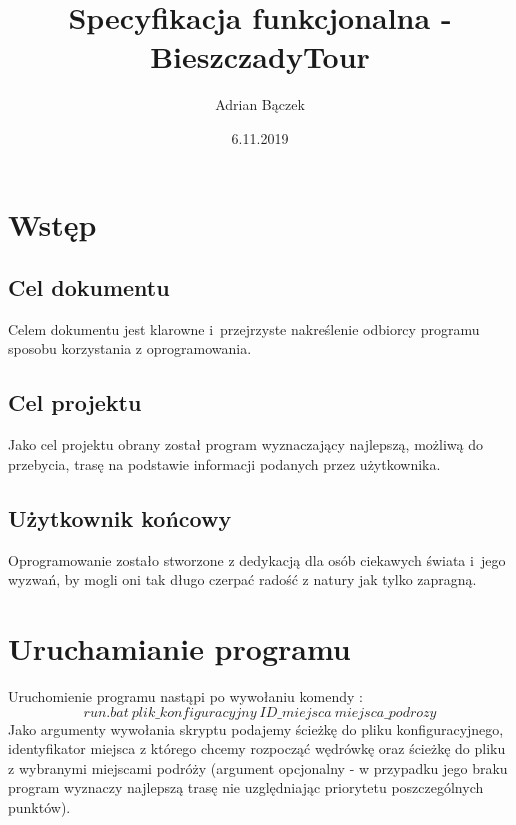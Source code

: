 \documentclass[10pt,oneside]{article}
\title{Specyfikacja funkcjonalna - BieszczadyTour}
\author{Adrian Bączek}
\date{6.11.2019}
\begin{document}
\maketitle


\thispagestyle{fancy}

\newpage


\section{Wstęp}
\subsection{Cel dokumentu}
Celem dokumentu jest klarowne i~przejrzyste nakreślenie 
odbiorcy programu sposobu korzystania z oprogramowania.
\subsection{Cel projektu}
Jako cel projektu obrany został program wyznaczający najlepszą, możliwą do przebycia, 
trasę na podstawie informacji podanych przez użytkownika.
\subsection{Użytkownik końcowy}
Oprogramowanie zostało stworzone z dedykacją dla osób ciekawych świata 
i~jego wyzwań, by mogli oni tak długo czerpać radość z natury jak tylko zapragną.

\section{Uruchamianie programu}
Uruchomienie programu nastąpi po wywołaniu komendy : $$run.bat~plik\_konfiguracyjny~ID\_miejsca~miejsca\_podrozy$$
Jako argumenty wywołania skryptu podajemy ścieżkę do pliku konfiguracyjnego, identyfikator miejsca 
z którego chcemy rozpocząć wędrówkę oraz ścieżkę do pliku z wybranymi miejscami podróży (argument opcjonalny - w przypadku jego braku program wyznaczy najlepszą trasę nie uzględniając priorytetu poszczególnych punktów).
\end{document}
